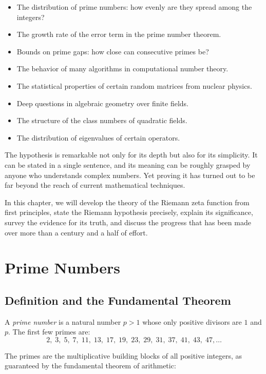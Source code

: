\begin{itemize}
  \item The distribution of prime numbers: how evenly are they spread among the integers?
  \item The growth rate of the error term in the prime number theorem.
  \item Bounds on prime gaps: how close can consecutive primes be?
  \item The behavior of many algorithms in computational number theory.
  \item The statistical properties of certain random matrices from nuclear physics.
  \item Deep questions in algebraic geometry over finite fields.
  \item The structure of the class numbers of quadratic fields.
  \item The distribution of eigenvalues of certain operators.
\end{itemize}

The hypothesis is remarkable not only for its depth but also for its simplicity. It can be stated in a single sentence, and its meaning can be roughly grasped by anyone who understands complex numbers. Yet proving it has turned out to be far beyond the reach of current mathematical techniques.

In this chapter, we will develop the theory of the Riemann zeta function from first principles, state the Riemann hypothesis precisely, explain its significance, survey the evidence for its truth, and discuss the progress that has been made over more than a century and a half of effort.

\section{Prime Numbers}
\label{sec:primes}

\subsection{Definition and the Fundamental Theorem}

A \textit{prime number} is a natural number $p > 1$ whose only positive divisors are $1$ and $p$. The first few primes are:
\[
2, \; 3, \; 5, \; 7, \; 11, \; 13, \; 17, \; 19, \; 23, \; 29, \; 31, \; 37, \; 41, \; 43, \; 47, \ldots
\]

The primes are the multiplicative building blocks of all positive integers, as guaranteed by the fundamental theorem of arithmetic:

